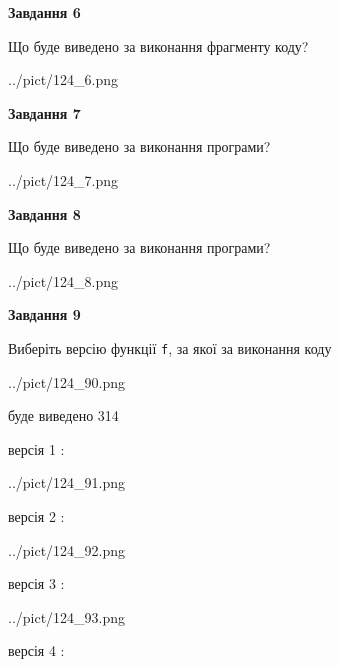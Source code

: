\documentclass[12pt, ukrainian]{article}
\def\code#1{\Verb!#1!}
\begin{document}
{\begin {large}
{\begin {center}\textbf{Завдання 6}\end {center}}

Що буде виведено за виконання фрагменту коду?\par
\begin{center}
	{../pict/124_6.png}
\end{center}
\newpage

{\begin {center}\textbf{Завдання 7}\end {center}}

Що буде виведено за виконання програми?\par
\begin{center}
	{../pict/124_7.png}
\end{center}
\newpage

{\begin {center}\textbf{Завдання 8}\end {center}}

Що буде виведено за виконання програми?\par
\begin{center}
	{../pict/124_8.png}
\end{center}
\newpage

{\begin {center}\textbf{Завдання 9}\end {center}}

Виберіть версію функції \code{f}, за якої за виконання коду
\begin{center}
	{../pict/124_90.png}
\end{center}
буде виведено 314

\vspace{5mm}
версія 1 :

\begin{center}
	{../pict/124_91.png}
\end{center}
версія 2 :

\begin{center}
	{../pict/124_92.png}
\end{center}
версія 3 :

\begin{center}
	{../pict/124_93.png}
\end{center}
версія 4 :


\end{large}}
\end{document}

